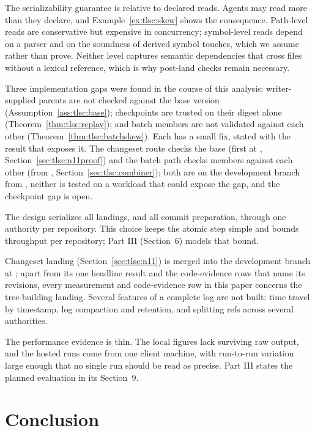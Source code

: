 \documentclass[11pt,letterpaper]{article}
\theoremstyle{definition}
\theoremstyle{remark}
\begin{document}
The serializability guarantee is relative to declared reads. Agents may read more than they declare, and Example~\ref{ex:tlsc:skew} shows the consequence. Path-level reads are conservative but expensive in concurrency; symbol-level reads depend on a parser and on the soundness of derived symbol touches, which we assume rather than prove. Neither level captures semantic dependencies that cross files without a lexical reference, which is why post-land checks remain necessary.

Three implementation gaps were found in the course of this analysis: writer-supplied parents are not checked against the base version (Assumption~\ref{ass:tlsc:base}); checkpoints are trusted on their digest alone (Theorem~\ref{thm:tlsc:replay}); and batch members are not validated against each other (Theorem~\ref{thm:tlsc:batchskew}). Each has a small fix, stated with the result that exposes it. The changeset route checks the base (first at , Section~\ref{sec:tlsc:n11proof}) and the batch path checks members against each other (from , Section~\ref{sec:tlsc:combiner}); both are on the development branch from , neither is tested on a workload that could expose the gap, and the checkpoint gap is open.

The design serializes all landings, and all commit preparation, through one authority per repository. This choice keeps the atomic step simple and bounds throughput per repository; Part III (Section~6) models that bound.

Changeset landing (Section~\ref{sec:tlsc:n11}) is merged into the development branch at ; apart from its one headline result and the code-evidence rows that name its revisions, every measurement and code-evidence row in this paper concerns the tree-building landing. Several features of a complete log are not built: time travel by timestamp, log compaction and retention, and splitting refs across several authorities.

The performance evidence is thin. The local figures lack surviving raw output, and the hosted runs come from one client machine, with run-to-run variation large enough that no single run should be read as precise. Part III states the planned evaluation in its Section~9.

\section{Conclusion}
\label{sec:tlsc:conclusion}
\end{document}
